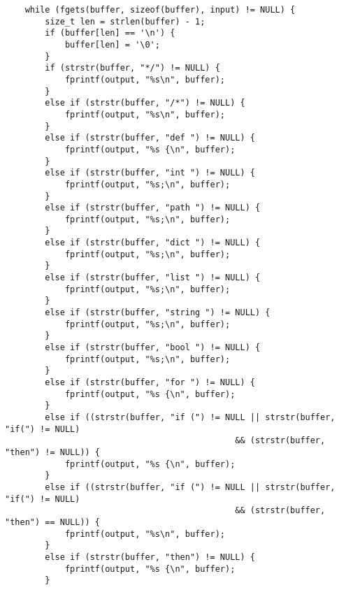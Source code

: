 \documentclass[11pt]{article}
\begin{document}
\begin{listing}[H]
  \begin{verbatim}
    while (fgets(buffer, sizeof(buffer), input) != NULL) {
        size_t len = strlen(buffer) - 1;
        if (buffer[len] == '\n') {
            buffer[len] = '\0';
        }
        if (strstr(buffer, "*/") != NULL) {
            fprintf(output, "%s\n", buffer);
        }
        else if (strstr(buffer, "/*") != NULL) {
            fprintf(output, "%s\n", buffer);
        }
        else if (strstr(buffer, "def ") != NULL) {
            fprintf(output, "%s {\n", buffer);
        }
        else if (strstr(buffer, "int ") != NULL) {
            fprintf(output, "%s;\n", buffer);
        }
        else if (strstr(buffer, "path ") != NULL) {
            fprintf(output, "%s;\n", buffer);
        }
        else if (strstr(buffer, "dict ") != NULL) {
            fprintf(output, "%s;\n", buffer);
        }
        else if (strstr(buffer, "list ") != NULL) {
            fprintf(output, "%s;\n", buffer);
        }
        else if (strstr(buffer, "string ") != NULL) {
            fprintf(output, "%s;\n", buffer);
        }
        else if (strstr(buffer, "bool ") != NULL) {
            fprintf(output, "%s;\n", buffer);
        }
        else if (strstr(buffer, "for ") != NULL) {
            fprintf(output, "%s {\n", buffer);
        }
        else if ((strstr(buffer, "if (") != NULL || strstr(buffer, "if(") != NULL)
                                              && (strstr(buffer, "then") != NULL)) {
            fprintf(output, "%s {\n", buffer);
        }
        else if ((strstr(buffer, "if (") != NULL || strstr(buffer, "if(") != NULL)
                                              && (strstr(buffer, "then") == NULL)) {
            fprintf(output, "%s\n", buffer);
        }
        else if (strstr(buffer, "then") != NULL) {
            fprintf(output, "%s {\n", buffer);
        }
  \end{verbatim}
\end{listing}
\end{document}

